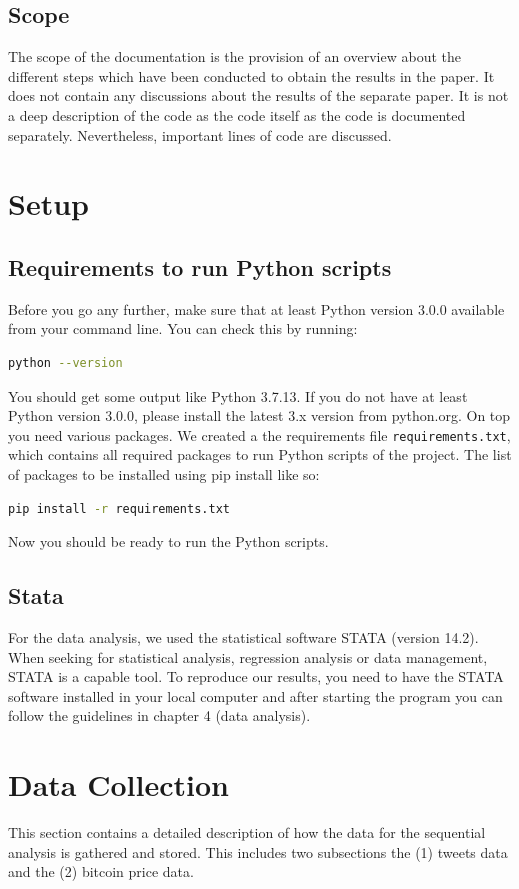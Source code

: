 \documentclass[a4paper,12pt]{article}
\begin{document}
\begin{spacing}{1.2}
\subsection{Scope}
The scope of the documentation is the provision of an overview about the different steps which have been conducted to obtain the results in the paper. It does not contain any discussions about the results of the separate paper. It is not a deep description of the code as the code itself as the code is documented separately. Nevertheless, important lines of code are discussed. 
\clearpage

\section{Setup}
\subsection{Requirements to run Python scripts}
Before you go any further, make sure that at least Python version 3.0.0 available from your command line. You can check this by running:
\begin{lstlisting}[language=bash]
    python --version
\end{lstlisting}
You should get some output like Python 3.7.13. If you do not have at least Python version 3.0.0, please install the latest 3.x version from python.org.
\newline
On top you need various packages. We created a the requirements file \verb|requirements.txt|, which contains all required packages to run Python scripts of the project. The list of packages to be installed using pip install like so:
\begin{lstlisting}[language=bash]
    pip install -r requirements.txt
\end{lstlisting}
Now you should be ready to run the Python scripts.

\subsection{Stata}
For the data analysis, we used the statistical software STATA (version 14.2). When seeking for statistical analysis, regression analysis or data management, STATA is a capable tool. To reproduce our results, you need to have the STATA software installed in your local computer and after starting the program you can follow the guidelines in chapter 4 (data analysis). 

\section{Data Collection}
This section contains a detailed description of how the data for the sequential analysis is gathered and stored. This includes two  subsections the (1) tweets data and the (2) bitcoin price data.

\end{spacing}
\end{document}

